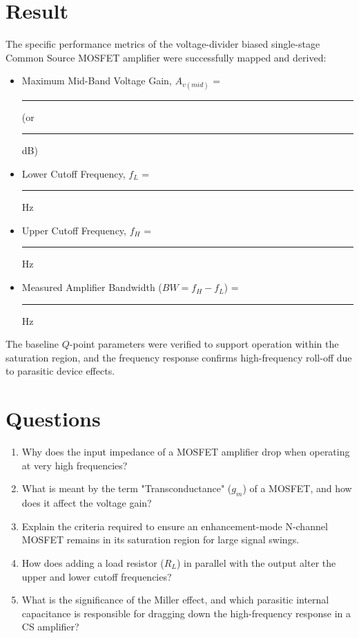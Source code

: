 \section{Result}
The specific performance metrics of the voltage-divider biased single-stage Common Source MOSFET amplifier were successfully mapped and derived:
\begin{itemize}
	\item Maximum Mid-Band Voltage Gain, $A_{v(mid)}$ = \rule{2cm}{0.15mm} (or \rule{2cm}{0.15mm} dB)
	\item Lower Cutoff Frequency, $f_L$ = \rule{2cm}{0.15mm} Hz
	\item Upper Cutoff Frequency, $f_H$ = \rule{2cm}{0.15mm} Hz
	\item Measured Amplifier Bandwidth ($BW = f_H - f_L$) = \rule{2cm}{0.15mm} Hz
\end{itemize}
The baseline $Q$-point parameters were verified to support operation within the saturation region, and the frequency response confirms high-frequency roll-off due to parasitic device effects.

\section{Questions}
\begin{enumerate}
	\item Why does the input impedance of a MOSFET amplifier drop when operating at very high frequencies?
	\item What is meant by the term "Transconductance" ($g_m$) of a MOSFET, and how does it affect the voltage gain?
	\item Explain the criteria required to ensure an enhancement-mode N-channel MOSFET remains in its saturation region for large signal swings.
	\item How does adding a load resistor ($R_L$) in parallel with the output alter the upper and lower cutoff frequencies?
	\item What is the significance of the Miller effect, and which parasitic internal capacitance is responsible for dragging down the high-frequency response in a CS amplifier?
\end{enumerate}